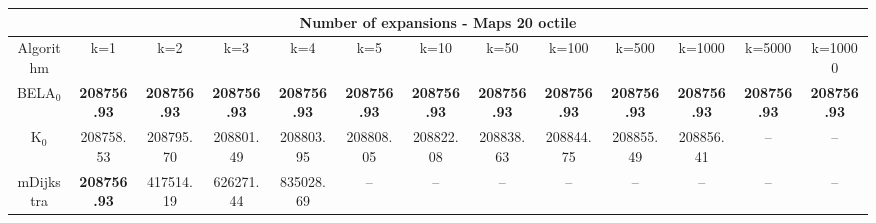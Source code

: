 \begin{tabular}{c|cccccccccccc}\toprule
\multicolumn{13}{c}{Number of expansions - Maps 20 octile}\\ \midrule
Algorithm & k=1 & k=2 & k=3 & k=4 & k=5 & k=10 & k=50 & k=100 & k=500 & k=1000 & k=5000 & k=10000 \\ \midrule
BELA$_0$ & \textbf{208756.93} & \textbf{208756.93} & \textbf{208756.93} & \textbf{208756.93} & \textbf{208756.93} & \textbf{208756.93} & \textbf{208756.93} & \textbf{208756.93} & \textbf{208756.93} & \textbf{208756.93} & \textbf{208756.93} & \textbf{208756.93} \\
K$_0$ & 208758.53 & 208795.70 & 208801.49 & 208803.95 & 208808.05 & 208822.08 & 208838.63 & 208844.75 & 208855.49 & 208856.41 & -- & -- \\
mDijkstra & \textbf{208756.93} & 417514.19 & 626271.44 & 835028.69 & -- & -- & -- & -- & -- & -- & -- & -- \\ \bottomrule 
\end{tabular}
